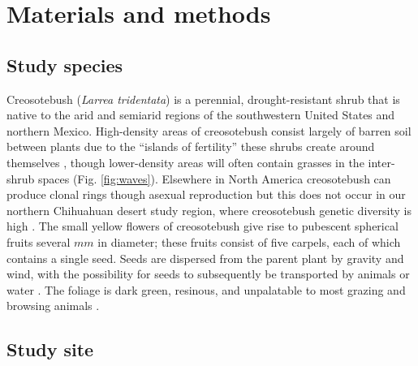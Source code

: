 \documentclass[11pt]{article}\usepackage[]{graphicx}\usepackage[]{color}
\begin{document}
\section*{Materials and methods}

\subsection*{Study species}

Creosotebush (\textit{Larrea tridentata}) is a perennial, drought-resistant  shrub that is native to the arid and semiarid regions of the southwestern United States and northern Mexico.
High-density areas of creosotebush consist largely of barren soil between plants due to the ``islands of fertility'' these shrubs create around themselves \citep{schlesinger1996spatial, reynolds1999impact}, though lower-density areas will often contain grasses in the inter-shrub spaces (Fig. \ref{fig:waves}).
Elsewhere in North America creosotebush can produce clonal rings though asexual reproduction \citep{vasek1980creosote} but this does not occur in our northern Chihuahuan desert study region, where creosotebush genetic diversity is high \citep{duran2005genetic}. 
The small yellow flowers of creosotebush give rise to pubescent spherical fruits several $mm$ in diameter; these fruits consist of five carpels, each of which contains a single seed.
Seeds are dispersed from the parent plant by gravity and wind, with the possibility for seeds to subsequently be transported by animals or water \citep{maddox1985wind}. 
The foliage is dark green, resinous, and unpalatable to most grazing and browsing animals \citep{mabry1978creosote}.

\subsection*{Study site}
\end{document}
